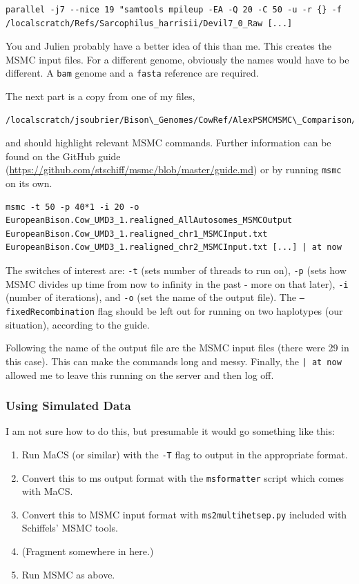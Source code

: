 \documentclass[11pt,a4paper]{article}
\begin{document}
\begin{lstlisting}
parallel -j7 --nice 19 "samtools mpileup -EA -Q 20 -C 50 -u -r {} -f /localscratch/Refs/Sarcophilus_harrisii/Devil7_0_Raw [...]
\end{lstlisting}
You and Julien probably have a better idea of this than me. This creates the MSMC input files. For a different genome, obviously the names would have to be different. A \texttt{bam} genome and a \texttt{fasta} reference are required.

The next part is a copy from one of my files, 
\begin{lstlisting}
/localscratch/jsoubrier/Bison\_Genomes/CowRef/AlexPSMCMSMC\_Comparison/labBook
\end{lstlisting}
and should highlight relevant MSMC commands. Further information can be found on the GitHub guide (\url{https://github.com/stschiff/msmc/blob/master/guide.md}) or by running \texttt{msmc} on its own.
\begin{lstlisting}
msmc -t 50 -p 40*1 -i 20 -o EuropeanBison.Cow_UMD3_1.realigned_AllAutosomes_MSMCOutput EuropeanBison.Cow_UMD3_1.realigned_chr1_MSMCInput.txt EuropeanBison.Cow_UMD3_1.realigned_chr2_MSMCInput.txt [...] | at now
\end{lstlisting}
The switches of interest are: \texttt{-t} (sets number of threads to run on), \texttt{-p} (sets how MSMC divides up time from now to infinity in the past - more on that later), \texttt{-i} (number of iterations), and \texttt{-o} (set the name of the output file). The \texttt{--fixedRecombination} flag should be left out for running on two haplotypes (our situation), according to the guide.

Following the name of the output file are the MSMC input files (there were 29 in this case). This can make the commands long and messy. Finally, the \texttt{| at now} allowed me to leave this running on the server and then log off.

\subsubsection{Using Simulated Data}
I am not sure how to do this, but presumable it would go something like this:
\begin{enumerate}
\item Run MaCS (or similar) with the \texttt{-T} flag to output in the appropriate format.
\item Convert this to ms output format with the \texttt{msformatter} script which comes with MaCS.
\item Convert this to MSMC input format with \texttt{ms2multihetsep.py} included with Schiffels' MSMC tools.
\item (Fragment somewhere in here.)
\item Run MSMC as above.
\end{enumerate}
\end{document}
